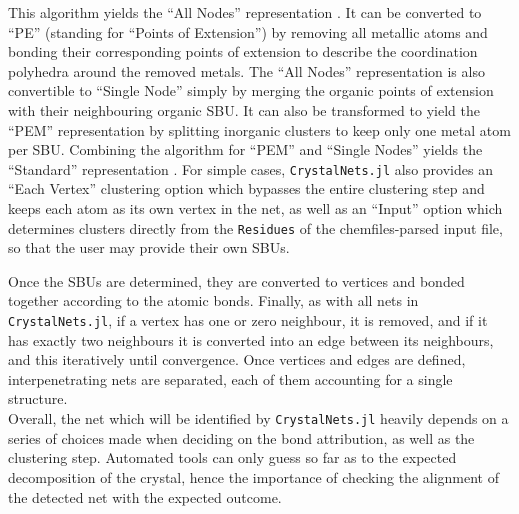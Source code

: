 \documentclass[main.tex]{subfiles}
\begin{document}
This algorithm yields the ``All Nodes'' representation . It can be converted to ``PE'' (standing for ``Points of Extension'') by removing all metallic atoms and bonding their corresponding points of extension to describe the coordination polyhedra around the removed metals. The ``All Nodes'' representation is also convertible to ``Single Node'' simply by merging the organic points of extension with their neighbouring organic SBU. It can also be transformed to yield the ``PEM'' representation by splitting inorganic clusters to keep only one metal atom per SBU. Combining the algorithm for ``PEM'' and ``Single Nodes'' yields the ``Standard'' representation \autocite{BlatovSimplify}. For simple cases, \texttt{CrystalNets.jl} also provides an ``Each Vertex'' clustering option which bypasses the entire clustering step and keeps each atom as its own vertex in the net, as well as an ``Input'' option which determines clusters directly from the \texttt{Residues} of the chemfiles-parsed input file, so that the user may provide their own SBUs.



Once the SBUs are determined, they are converted to vertices and bonded together according to the atomic bonds. %
Finally, as with all nets in \texttt{CrystalNets.jl}, if a vertex has one or zero neighbour, it is removed, and if it has exactly two neighbours it is converted into an edge between its neighbours, and this iteratively until convergence. Once vertices and edges are defined, interpenetrating nets are separated, each of them accounting for a single structure.\\

Overall, the net which will be identified by \texttt{CrystalNets.jl} heavily depends on a series of choices made when deciding on the bond attribution, as well as the clustering step. Automated tools can only guess so far as to the expected decomposition of the crystal, hence the importance of checking the alignment of the detected net with the expected outcome.
\end{document}
